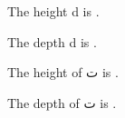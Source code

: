 \documentclass{article}
\newlength\taaheight
\newlength\taadepth
\newlength\dheight
\newlength\ddepth
\begin{document}
The height d is \the\dheight.

The depth d is \the\ddepth.

\bigskip

The height of \textarabic{ت} is \the\taaheight.

The depth of \textarabic{ت} is \the\taadepth.
\end{document}
